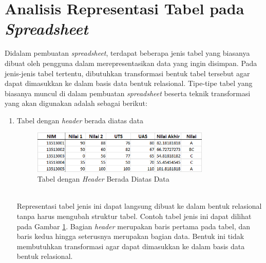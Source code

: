 \section{Analisis Representasi Tabel pada \textit{Spreadsheet}}
Didalam pembuatan \textit{spreadsheet}, terdapat beberapa jenis tabel yang biasanya dibuat oleh pengguna dalam merepresentasikan data yang ingin disimpan. Pada jenis-jenis tabel tertentu, dibutuhkan transformasi bentuk tabel tersebut agar dapat dimasukkan ke dalam basis data bentuk relasional. Tipe-tipe tabel yang biasanya muncul di dalam pembuatan \textit{spreadsheet} beserta teknik transformasi yang akan digunakan adalah sebagai berikut:
\begin{enumerate}
	\item Tabel dengan \textit{header} berada diatas data
	\begin{figure}[htbp]
	    \centering
	    \includegraphics[width=0.8\textwidth]{resources/chapter-3-tabletype-1.png}
	    \caption{Tabel dengan \textit{Header} Berada Diatas Data}
		\label{TabelTipe1}
	\end{figure}\\
	Representasi tabel jenis ini dapat langsung dibuat ke dalam bentuk relasional tanpa harus mengubah struktur tabel. Contoh tabel jenis ini dapat dilihat pada Gambar \ref{TabelTipe1}. Bagian \textit{header} merupakan baris pertama pada tabel, dan baris kedua hingga seterusnya merupakan bagian data. Bentuk ini tidak membutuhkan transformasi agar dapat dimasukkan ke dalam basis data bentuk relasional.


\end{enumerate}
